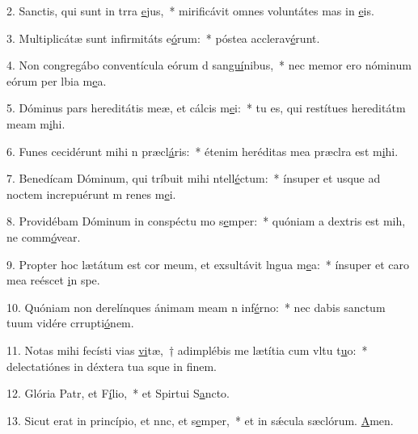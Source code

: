 2. Sanctis, qui sunt in trra \uline{e}jus,~* mirificávit omnes voluntátes mas in \uline{e}is.\par 
3. Multiplicátæ sunt infirmitáts e\uline{ó}rum:~* póstea acclerav\uline{é}runt.\par 
4. Non congregábo conventícula eórum d san\uline{guí}nibus,~* nec memor ero nóminum eórum per lbia m\uline{e}a.\par 
5. Dóminus pars hereditátis meæ, et cálcis m\uline{e}i:~* tu es, qui restítues hereditátm meam m\uline{i}hi.\par 
6. Funes cecidérunt mihi n præcl\uline{á}ris:~* étenim heréditas mea præclra est m\uline{i}hi.\par 
7. Benedícam Dóminum, qui tríbuit mihi ntell\uline{é}ctum:~* ínsuper et usque ad noctem increpuérunt m renes m\uline{e}i.\par 
8. Providébam Dóminum in conspéctu mo s\uline{e}mper:~* quóniam a dextris est mih, ne comm\uline{ó}vear.\par 
9. Propter hoc lætátum est cor meum, et exsultávit lngua m\uline{e}a:~* ínsuper et caro mea reéscet \uline{i}n spe.\par 
10. Quóniam non derelínques ánimam meam n inf\uline{é}rno:~* nec dabis sanctum tuum vidére crrupti\uline{ó}nem.\par 
11. Notas mihi fecísti vias \uline{vi}tæ,~† adimplébis me lætítia cum vltu t\uline{u}o:~* delectatiónes in déxtera tua sque in f\uline{i}nem.\par 
12. Glória Patr, et F\uline{í}lio,~* et Spirtui S\uline{a}ncto.\par 
13. Sicut erat in princípio, et nnc, et s\uline{e}mper,~* et in sǽcula sæclórum. \uline{A}men.\par 
